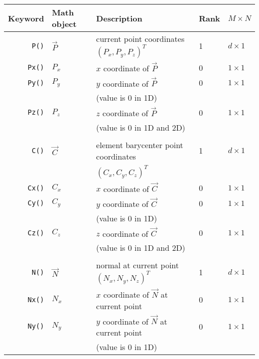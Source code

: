 \begin{longtable}[c]{rllll}
  Keyword & Math object & Description & Rank & $M \times N$\\\hline\hline

  \endhead
  \lstinline!P()! & $\overrightarrow{P}$ & current point coordinates $(P_x, P_y, P_z)^T$ & 1 & $d \times 1$ \\

  \lstinline!Px()! & $P_x$ & $x$ coordinate of $\overrightarrow{P}$ & 0 & $1 \times 1$\\

  \lstinline!Py()! & $P_y$ & $y$ coordinate of $\overrightarrow{P}$ & 0 & $1 \times 1$\\
  & &  (value is 0 in 1D) & &\\

  \lstinline!Pz()! & $P_z$ & $z$ coordinate of $\overrightarrow{P}$& 0 & $1 \times 1$\\
  & &  (value is 0 in 1D and 2D)  & &\\\hline\\

  \lstinline!C()! & $\overrightarrow{C}$ & element barycenter point coordinates  & 1 & $d \times 1$ \\
  &&$(C_x, C_y, C_z)^T$&&\\

  \lstinline!Cx()! & $C_x$ & $x$ coordinate of $\overrightarrow{C}$ & 0 & $1 \times 1$\\

  \lstinline!Cy()! & $C_y$ & $y$ coordinate of $\overrightarrow{C}$ & 0 & $1 \times 1$\\
  & &  (value is 0 in 1D) & &\\

  \lstinline!Cz()! & $C_z$ & $z$ coordinate of $\overrightarrow{C}$& 0 & $1 \times 1$\\
  & &  (value is 0 in 1D and 2D)  & &\\\hline\\


  \lstinline!N()! & $\overrightarrow{N}$ & normal at current point $(N_x,N_y,N_z)^T$ & 1 & $d \times 1$\\

  \lstinline!Nx()! & $N_x$ & $x$ coordinate of $\overrightarrow{N}$ at current point & 0 & $1 \times 1$\\

  \lstinline!Ny()! & $N_y$ & $y$ coordinate of $\overrightarrow{N}$ at current point & 0 & $1 \times 1$\\
  & &  (value is 0 in 1D) & &\\


\end{longtable}
